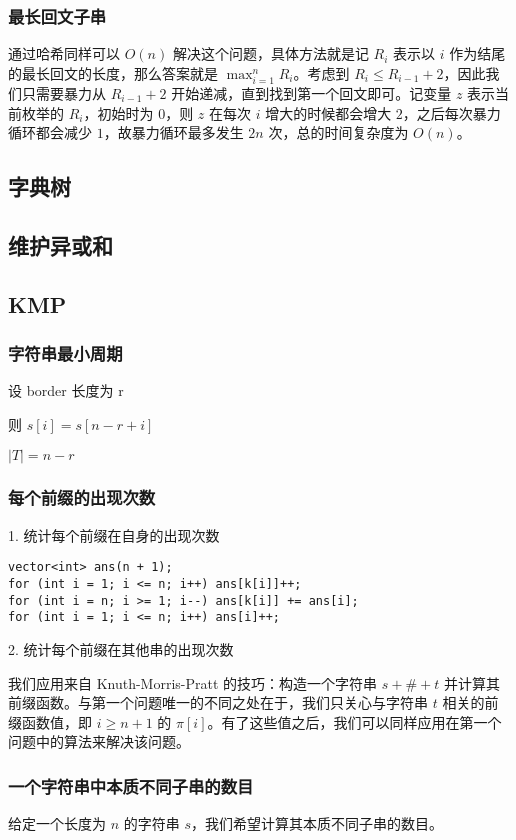 \documentclass[a4paper]{article}
\begin{document}
\subsubsection{最长回文子串}
通过哈希同样可以 $O(n)$ 解决这个问题，具体方法就是记 $R_i$ 表示以 $i$ 作为结尾的最长回文的长度，那么答案就是 $\max_{i=1}^nR_i$。考虑到 $R_i\leq R_{i-1}+2$，因此我们只需要暴力从 $R_{i-1}+2$ 开始递减，直到找到第一个回文即可。记变量 $z$ 表示当前枚举的 $R_i$，初始时为 $0$，则 $z$ 在每次 $i$ 增大的时候都会增大 $2$，之后每次暴力循环都会减少 $1$，故暴力循环最多发生 $2n$ 次，总的时间复杂度为 $O(n)$。
\subsection{字典树}
\subsection{维护异或和}

\subsection{KMP}

\subsubsection{字符串最小周期}

设 border 长度为 r

则 $s[i]=s[n-r+i]$

$|T|=n-r$
\subsubsection{每个前缀的出现次数}
1. 统计每个前缀在自身的出现次数
\begin{lstlisting}
vector<int> ans(n + 1);
for (int i = 1; i <= n; i++) ans[k[i]]++;
for (int i = n; i >= 1; i--) ans[k[i]] += ans[i];
for (int i = 1; i <= n; i++) ans[i]++;
\end{lstlisting}

2. 统计每个前缀在其他串的出现次数

我们应用来自 Knuth-Morris-Pratt 的技巧：构造一个字符串 $s + \# + t$ 并计算其前缀函数。与第一个问题唯一的不同之处在于，我们只关心与字符串 $t$ 相关的前缀函数值，即 $i \ge n + 1$ 的 $\pi[i]$。有了这些值之后，我们可以同样应用在第一个问题中的算法来解决该问题。

\subsubsection{一个字符串中本质不同子串的数目}
给定一个长度为 $n$ 的字符串 $s$，我们希望计算其本质不同子串的数目。
\end{document}
